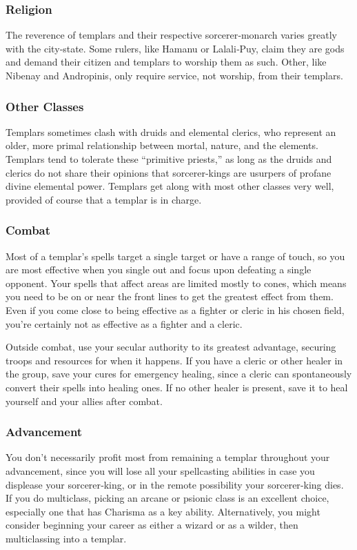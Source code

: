 \subsubsection{Religion}
The reverence of templars and their respective sorcerer‐monarch varies greatly with the city‐state. Some rulers, like Hamanu or Lalali‐Puy, claim they are gods and demand their citizen and templars to worship them as such. Other, like Nibenay and Andropinis, only require service, not worship, from their templars.

\subsubsection{Other Classes}
Templars sometimes clash with druids and elemental clerics, who represent an older, more primal relationship between mortal, nature, and the elements. Templars tend to tolerate these “primitive priests,” as long as the druids and clerics do not share their opinions that sorcerer‐kings are usurpers of profane divine elemental power. Templars get along with most other classes very well, provided of course that a templar is in charge.

\subsubsection{Combat}
Most of a templar's spells target a single target or have a range of touch, so you are most effective when you single out and focus upon defeating a single opponent. Your spells that affect areas are limited mostly to cones,
which means you need to be on or near the front lines to get the greatest effect from them. Even if you come close to being effective as a fighter or cleric in his chosen field, you're certainly not as effective as a fighter and a cleric.

Outside combat, use your secular authority to its greatest advantage, securing troops and resources for when it happens. If you have a cleric or other healer in the group, save your cures for emergency healing, since a cleric can spontaneously convert their spells into healing ones. If no other healer is present, save it to heal yourself and your allies after combat.

\subsubsection{Advancement}
You don't necessarily profit most from remaining a templar throughout your advancement, since you will lose all your spellcasting abilities in case you displease your sorcerer‐king, or in the remote possibility your sorcerer‐king dies. If you do multiclass, picking an arcane or psionic class is an excellent choice, especially one that has Charisma as a key ability. Alternatively, you might consider beginning your career as either a wizard or as a wilder, then multiclassing into a templar.

